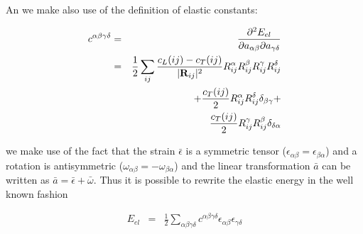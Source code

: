An we make also use of the definition of elastic constants:

\begin{eqnarray}\label{elconst}
c^{\alpha\beta\gamma\delta} &= &
\frac{\partial^2E_{el}}{\partial a_{\alpha\beta} \partial a_{\gamma\delta}} \\
&=& \frac{1}{2}\sum_{ij}\frac{c_L(ij)-c_T(ij)}{|\mathbf R_{ij}|^2} 
R_{ij}^{\alpha}R_{ij}^{\beta}R_{ij}^{\gamma}R_{ij}^{\delta}
 \nonumber \\
&& +    \frac{c_T(ij)}{2} R_{ij}^{\alpha}R_{ij}^{\delta}
 \delta_{\beta\gamma}  + \nonumber \\
&& \frac{c_T(ij)}{2} R_{ij}^{\gamma} R_{ij}^{\beta}
 \delta_{\delta\alpha} 
\end{eqnarray}



we make use of the fact that the strain $\bar \epsilon$ is a symmetric 
tensor ($\epsilon_{\alpha\beta}=\epsilon_{\beta\alpha}$) and a rotation
is antisymmetric ($\omega_{\alpha\beta}=-\omega_{\beta\alpha}$) and 
the linear transformation $\bar a$ can be written as $\bar a=\bar \epsilon + \bar \omega$. Thus
it is possible to rewrite the elastic energy in the well known fashion

\begin{eqnarray}\label{Eelconst}
E_{el} &=& \frac{1}{2}\sum_{\alpha\beta\gamma\delta} c^{\alpha\beta\gamma\delta} \epsilon_{\alpha\beta}\epsilon_{\gamma\delta}
\end{eqnarray}



